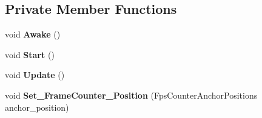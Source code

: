 \subsection*{Private Member Functions}
\begin{DoxyCompactItemize}
\item 
\mbox{\label{class_t_m_pro_1_1_examples_1_1_t_m_p___ui_frame_rate_counter_a63733cd9f5d1e78a990a482525bbbee9}} 
void {\bfseries Awake} ()
\item 
\mbox{\label{class_t_m_pro_1_1_examples_1_1_t_m_p___ui_frame_rate_counter_aa9ff3b65ff7b296c647b5241b863d6ee}} 
void {\bfseries Start} ()
\item 
\mbox{\label{class_t_m_pro_1_1_examples_1_1_t_m_p___ui_frame_rate_counter_a67a50a896baf5d72fefc16cc9d7087f2}} 
void {\bfseries Update} ()
\item 
\mbox{\label{class_t_m_pro_1_1_examples_1_1_t_m_p___ui_frame_rate_counter_a14ce96ceee956401615e16ad2709ab53}} 
void {\bfseries Set\+\_\+\+Frame\+Counter\+\_\+\+Position} (Fps\+Counter\+Anchor\+Positions anchor\+\_\+position)
\end{DoxyCompactItemize}

